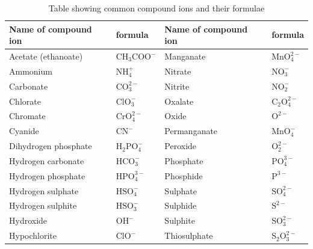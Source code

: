           \begin{table}[H]
        \begin{center}
      \label{m38689*uid99}
    \noindent
      \begin{tabular}{|l|l|l|l|}\hline
\textbf{Name of compound ion} & \textbf{formula}                      &  \textbf{Name of compound ion} & \textbf{formula} \\ \hline
Acetate (ethanoate)           & ${\text{CH}}_{3}{\text{COO}}^{-}$ & Manganate                      & $\text{MnO}_{4}^{2-}$ \\ \hline
Ammonium                      & $\text{NH}_{4}^{+}$                 & Nitrate                        & $\text{NO}_{3}^{-}$  \\ \hline
Carbonate                     & $\text{CO}_{3}^{2-}$                & Nitrite                        & $\text{NO}_{2}^{-}$ \\ \hline
Chlorate                      & $\text{ClO}_{3}^{-}$                & Oxalate                        & ${\text{C}}_{2}\text{O}_{4}^{2-}$ \\ \hline
Chromate                      & $\text{CrO}_{4}^{2-}$               & Oxide                          & ${\text{O}}^{2-}$ \\ \hline
Cyanide                       & ${\text{CN}}^{-}$                   & Permanganate                   & $\text{MnO}_{4}^{-}$ \\ \hline
Dihydrogen phosphate          & ${\text{H}}_{2}\text{PO}_{4}^{-}$ & Peroxide                       & $\text{O}_{2}^{2-}$ \\ \hline
Hydrogen carbonate            & $\text{HCO}_{3}^{-}$                & Phosphate                      & $\text{PO}_{4}^{3-}$ \\ \hline
Hydrogen phosphate            & $\text{HPO}_{4}^{3-}$               & Phosphide                      & ${\text{P}}^{3-}$   \\ \hline
Hydrogen sulphate             & $\text{HSO}_{4}^{-}$                & Sulphate                       &  $\text{SO}_{4}^{2-}$  \\ \hline
Hydrogen sulphite             & $\text{HSO}_{3}^{-}$                & Sulphide                       & ${\text{S}}^{2-}$ \\ \hline
Hydroxide                     & ${\text{OH}}^{-}$                   & Sulphite                       & $\text{SO}_{3}^{2-}$ \\ \hline
Hypochlorite                  & ${\text{ClO}}^{-}$                  & Thiosulphate                   & ${\text{S}}_{2}\text{O}_{3}^{2-}$ \\ \hline       
    \end{tabular}
      \end{center}
    \caption{Table showing common compound ions and their formulae}
\label{tab:ions}
\end{table}
    \par
	\par

